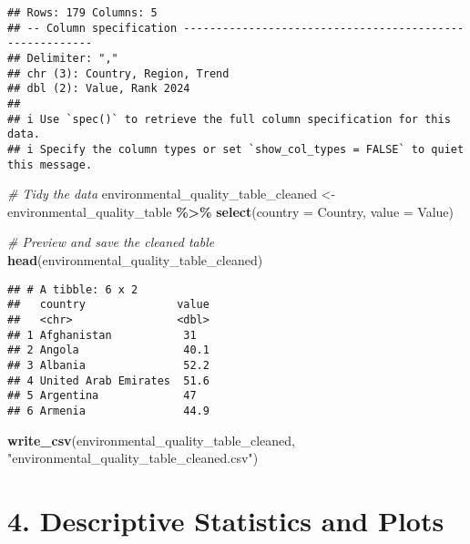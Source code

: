 \documentclass[
]{article}
\newenvironment{Shaded}{\begin{snugshade}}{\end{snugshade}}
\newcommand{\AttributeTok}[1]{\textcolor[rgb]{0.13,0.29,0.53}{#1}}
\newcommand{\CommentTok}[1]{\textcolor[rgb]{0.56,0.35,0.01}{\textit{#1}}}
\newcommand{\FunctionTok}[1]{\textcolor[rgb]{0.13,0.29,0.53}{\textbf{#1}}}
\newcommand{\NormalTok}[1]{#1}
\newcommand{\OtherTok}[1]{\textcolor[rgb]{0.56,0.35,0.01}{#1}}
\newcommand{\SpecialCharTok}[1]{\textcolor[rgb]{0.81,0.36,0.00}{\textbf{#1}}}
\newcommand{\StringTok}[1]{\textcolor[rgb]{0.31,0.60,0.02}{#1}}
\begin{document}
\begin{verbatim}
## Rows: 179 Columns: 5
## -- Column specification --------------------------------------------------------
## Delimiter: ","
## chr (3): Country, Region, Trend
## dbl (2): Value, Rank 2024
## 
## i Use `spec()` to retrieve the full column specification for this data.
## i Specify the column types or set `show_col_types = FALSE` to quiet this message.
\end{verbatim}

\begin{Shaded}
\begin{Highlighting}[]
\CommentTok{\# Tidy the data}
\NormalTok{environmental\_quality\_table\_cleaned }\OtherTok{\textless{}{-}}\NormalTok{ environmental\_quality\_table }\SpecialCharTok{\%\textgreater{}\%}
  \FunctionTok{select}\NormalTok{(}\AttributeTok{country =} \StringTok{\textasciigrave{}}\AttributeTok{Country}\StringTok{\textasciigrave{}}\NormalTok{, }\AttributeTok{value =} \StringTok{\textasciigrave{}}\AttributeTok{Value}\StringTok{\textasciigrave{}}\NormalTok{)}

\CommentTok{\# Preview and save the cleaned table}
\FunctionTok{head}\NormalTok{(environmental\_quality\_table\_cleaned)}
\end{Highlighting}
\end{Shaded}

\begin{verbatim}
## # A tibble: 6 x 2
##   country              value
##   <chr>                <dbl>
## 1 Afghanistan           31  
## 2 Angola                40.1
## 3 Albania               52.2
## 4 United Arab Emirates  51.6
## 5 Argentina             47  
## 6 Armenia               44.9
\end{verbatim}

\begin{Shaded}
\begin{Highlighting}[]
\FunctionTok{write\_csv}\NormalTok{(environmental\_quality\_table\_cleaned, }\StringTok{"environmental\_quality\_table\_cleaned.csv"}\NormalTok{)}
\end{Highlighting}
\end{Shaded}

\section{4. Descriptive Statistics and
Plots}\label{descriptive-statistics-and-plots}
\end{document}
